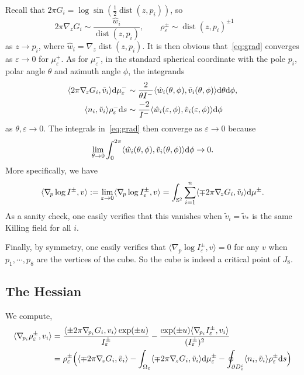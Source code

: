 \documentclass[a4paper]{amsart}
\newcommand{\uS}{\mathbb{S}}
\newcommand{\dist}{\operatorname{dist}}
\newcommand{\dd}{{\rm d}}
\theoremstyle{plain} %
\theoremstyle{definition} %
\theoremstyle{remark}
\begin{document}
\medskip

Recall that $2\pi G_i = \log \sin (\frac{1}{2} \dist(z, p_i))$, so
\[
	2\pi \nabla_{\! z} G_i \sim \frac{\hat w_i}{\dist(z, p_i)}, \qquad
	\rho^\pm_\varepsilon \sim \dist(z, p_i)^{\pm 1} \qquad
\]
as $z \to p_i$, where $\hat w_i = \nabla_z \dist(z, p_i)$.  It is then
obvious that~\eqref{eq:grad} converges as $\varepsilon \to 0$ for
$\mu^+_\varepsilon$.  As for $\mu^-_\varepsilon$, in the standard spherical
coordinate with the pole $p_i$, polar angle $\theta$ and azimuth angle $\phi$,
the integrands
\begin{align*}
	\langle 2\pi \nabla_{\! z} G_i, \tilde v_i \rangle \dd\mu_\varepsilon^-
	&\sim \frac{2}{\theta I^-} \langle \hat w_i(\theta, \phi), \tilde v_i(\theta, \phi) \rangle \dd \theta \dd \phi,\\
	\langle n_i, \tilde v_i \rangle \rho_\varepsilon^- \dd s
	&\sim \frac{-2}{I^-} \langle \hat w_i(\varepsilon, \phi), \tilde v_i(\varepsilon, \phi) \rangle \dd \phi
\end{align*}
as $\theta, \varepsilon \to 0$.  The integrals in~\eqref{eq:grad} then converge
as $\varepsilon \to 0$ because
\[
	\lim_{\theta \to 0} \int_0^{2\pi} \langle \hat w_i(\theta, \phi), \tilde v_i(\theta, \phi) \rangle \dd \phi \to 0.
\]
More specifically, we have
\[
	\langle \nabla_{\! p} \log I^\pm, v\rangle :=
	\lim_{\varepsilon\to 0}\langle \nabla_{\! p} \log I^\pm_\varepsilon, v\rangle 
	= \int_{\uS^2} \sum_{i=1}^n \langle \mp 2\pi \nabla_{\! z} G_i, \tilde v_i \rangle \dd\mu^\pm.
\]
As a sanity check, one easily verifies that this vanishes when $\tilde v_i =
\tilde v_*$ is the same Killing field for all $i$.

\medskip

Finally, by symmetry, one easily verifies that $\langle \nabla_{\! p} \log
I^\pm_\varepsilon, v\rangle = 0$ for any $v$ when $p_1,\cdots,p_8$ are the
vertices of the cube. So the cube is indeed a critical point of $J_8$.

\subsection{The Hessian}

We compute,
\begin{align*}
	\langle \nabla_{\! p_i} \rho^\pm_\varepsilon, v_i\rangle
	&=
	\frac{\langle \pm 2\pi \nabla_{\! p_i} G_i, v_i \rangle \exp(\pm u)}{I_\varepsilon^\pm}
	-
	\frac{\exp(\pm u) \langle \nabla_{\! p_i} I_\varepsilon^\pm, v_i\rangle}{(I_\varepsilon^\pm)^2}
	\\
	&= \rho_\varepsilon^\pm \Big(
		\langle \mp 2\pi \nabla_{\! z} G_i, \tilde v_i \rangle
		- \int_{\Omega_\varepsilon} \langle \mp 2\pi \nabla_{\! z} G_i, \tilde v_i \rangle \dd\mu_\varepsilon^\pm
		- \oint_{\partial D^i_\varepsilon} \langle n_i, \tilde v_i \rangle \rho_\varepsilon^\pm \dd s
	\Big)
\end{align*}
\end{document}
